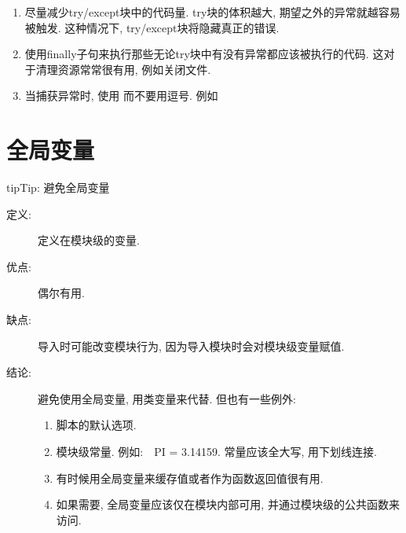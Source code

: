 \documentclass[a4paper,10pt,english]{sphinxmanual}
\begin{document}
\begin{description}
\begin{enumerate}
\item {} 
尽量减少try/except块中的代码量. try块的体积越大, 期望之外的异常就越容易被触发. 这种情况下, try/except块将隐藏真正的错误.

\item {} 
使用finally子句来执行那些无论try块中有没有异常都应该被执行的代码. 这对于清理资源常常很有用, 例如关闭文件.

\item {} 
当捕获异常时, 使用  而不要用逗号. 例如
\begin{quote}

%
\begin{sphinxVerbatim}[commandchars=\\\{\}]
     
   
\end{sphinxVerbatim}
\end{quote}

\end{enumerate}

\end{description}


\section{全局变量}
\label{\detokenize{python_language_rules:id4}}
\begin{sphinxadmonition}{tip}{Tip:}
避免全局变量
\end{sphinxadmonition}
\begin{description}
\item[{定义:}] \leavevmode
定义在模块级的变量.

\item[{优点:}] \leavevmode
偶尔有用.

\item[{缺点:}] \leavevmode
导入时可能改变模块行为, 因为导入模块时会对模块级变量赋值.

\item[{结论:}] \leavevmode
避免使用全局变量, 用类变量来代替. 但也有一些例外:
\begin{enumerate}
\item {} 
脚本的默认选项.

\item {} 
模块级常量. 例如:　PI = 3.14159. 常量应该全大写, 用下划线连接.

\item {} 
有时候用全局变量来缓存值或者作为函数返回值很有用.

\item {} 
如果需要, 全局变量应该仅在模块内部可用, 并通过模块级的公共函数来访问.

\end{enumerate}

\end{description}
\end{document}
